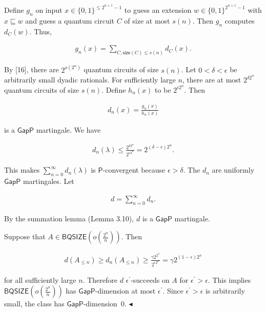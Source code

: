 \documentclass[10pt,a4paper]{article}
\begin{document}
Define $g_{n}$ on input $x\in\{0,1\}^{\leq 2^{n+1}-1}$ to guess an extension $w\in\{0,1\}^{2^{n+1}-1}$ with $x\sqsubseteq w$ and guess a quantum circuit $C$ of size at most $s(n)$. Then $g_{n}$ computes $d_{C}(w)$. Thus,\par


\[\begin{gathered}
g_{n}(x)=\sum\limits_{C,\mathsf{size}(C)\leq s(n)}d_{C}(x).
\end{gathered}\]




By [16], there are $2^{o(2^{n})}$ quantum circuits of size $s(n)$. Let $0<\delta<\epsilon$ be arbitrarily small dyadic rationals. For sufficiently large $n$, there are at most $2^{\delta 2^{n}}$ quantum circuits of size $s(n)$.
Define $h_{n}(x)$ to be $2^{\epsilon 2^{n}}$. Then\par


\[\begin{gathered}
d_{n}(x)=\frac{g_{n}(x)}{h_{n}(x)}
\end{gathered}\]


is a $\mathsf{GapP}$ martingale. We have\par


\[\begin{gathered}
d_{n}(\lambda)\leq\frac{2^{\delta 2^{n}}}{2^{\epsilon 2^{n}}}=2^{(\delta-\epsilon)2^{n}}.
\end{gathered}\]


This makes $\sum\limits_{n=0}^{\infty}d_{n}(\lambda)$ is $\mathsf{P}$-convergent because $\epsilon>\delta$. The $d_{n}$ are uniformly $\mathsf{GapP}$ martingales.
Let\par


\[\begin{gathered}
d=\sum\limits_{n=0}^{\infty}d_{n}.
\end{gathered}\]


By the summation lemma (Lemma 3.10), $d$ is a $\mathsf{GapP}$ martingale.\par




Suppose that $A\in\mathsf{BQSIZE}(o(\frac{2^{n}}{n}))$. Then\par


\[\begin{gathered}
d(A_{\leq n})\geq d_{n}(A_{\leq n})\geq\frac{\gamma 2^{2^{n}}}{2^{\epsilon 2^{n}}}=\gamma 2^{(1-\epsilon)2^{n}}
\end{gathered}\]


for all sufficiently large $n$. Therefore $d$ $\epsilon^{\prime}$-succeeds on $A$ for $\epsilon^{\prime}>\epsilon$. This implies $\mathsf{BQSIZE}(o(\frac{2^{n}}{n}))$ has $\mathsf{GapP}$-dimension at most $\epsilon^{\prime}$. Since $\epsilon^{\prime}>\epsilon$ is arbitrarily small, the class has $\mathsf{GapP}$-dimension 0.
$\blacktriangleleft$\par
\end{document}
